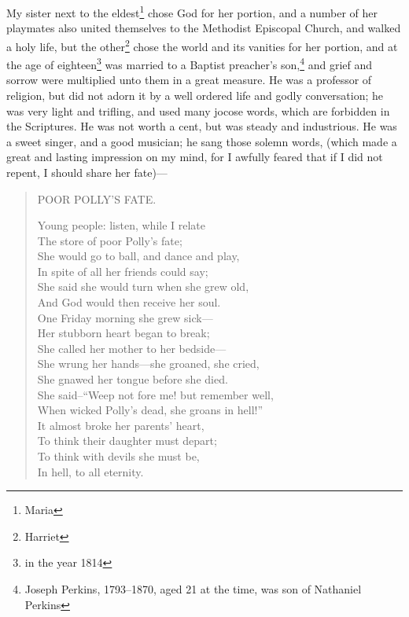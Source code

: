 My sister next to the eldest\footnote{Maria} chose God for her portion, and a number of her playmates also united themselves to the Methodist Episcopal Church, and walked a holy life, but the other\footnote{Harriet} chose the world and its vanities for her portion, and at the age of eighteen\footnote{in the year 1814} was married to a Baptist preacher's son,\footnote{Joseph Perkins, 1793--1870, aged 21 at the time, was son of Nathaniel Perkins} and grief and sorrow were multiplied unto them in a great measure.
He was a professor of religion, but did not adorn it by a well ordered life and godly conversation; he was very light and trifling, and used many jocose words, which are forbidden in the Scriptures.
He was not worth a cent, but was steady and industrious.
He was a sweet singer, and a good musician; he sang those solemn words, (which made a great and lasting impression on my mind, for I awfully feared that if I did not repent, I should share her fate)---
\begin{quote}
    \begin{center}
        POOR POLLY'S FATE.
    \end{center}
    Young people: listen, while I relate\\
    The store of poor Polly's fate;\\
    She would go to ball, and dance and play,\\
    In spite of all her friends could say;\\
    She said she would turn when she grew old,\\
    And God would then receive her soul.\\
    One Friday morning she grew sick---\\
    Her stubborn heart began to break;\\
    She called her mother to her bedside---\\
    She wrung her hands---she groaned, she cried,\\
    She gnawed her tongue before she died.\\
    She said--``Weep not fore me! but remember well,\\
    When wicked Polly's dead, she groans in hell!''\\
    It almost broke her parents' heart,\\
    To think their daughter must depart;\\
    To think with devils she must be,\\
    In hell, to all eternity.\\
\end{quote}

